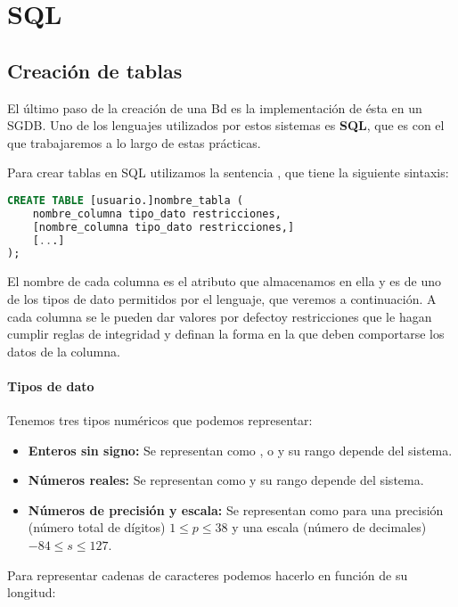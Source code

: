 \chapter{SQL}

\section{Creación de tablas}

El último paso de la creación de una Bd es la implementación de ésta en un SGDB\@.
Uno de los lenguajes utilizados por estos sistemas es \textbf{SQL}, que es con el que trabajaremos a lo largo de estas prácticas.

Para crear tablas en SQL utilizamos la sentencia , que tiene la siguiente sintaxis:

\begin{lstlisting}[language=SQL]
CREATE TABLE [usuario.]nombre_tabla (
	nombre_columna tipo_dato restricciones,
	[nombre_columna tipo_dato restricciones,]
	[...]
);
\end{lstlisting}

El nombre de cada columna es el atributo que almacenamos en ella y es de uno de los tipos de dato permitidos por el lenguaje, que veremos a continuación.
A cada columna se le pueden dar valores por defectoy restricciones que le hagan cumplir reglas de integridad y definan la forma en la que deben comportarse los datos de la columna.

\subsubsection{Tipos de dato}

Tenemos tres tipos numéricos que podemos representar:

\begin{itemize}
	\item\textbf{Enteros sin signo:} Se representan como ,  o  y su rango depende del sistema.
	\item\textbf{Números reales:} Se representan como  y su rango depende del sistema.
	\item\textbf{Números de precisión y escala:} Se representan como  para una precisión (número total de dígitos) $1\leq p\leq38$ y una escala (número de decimales) $-84\leq s\leq127$.
\end{itemize}

Para representar cadenas de caracteres podemos hacerlo en función de su longitud:

